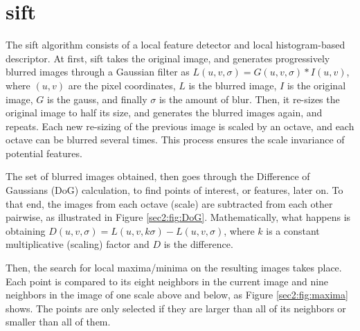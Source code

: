 \section{\acrlong{sift}}
\label{appendix:cha1:sift}
The \acrshort{sift} algorithm consists of a local feature detector and local histogram-based descriptor. At first, \acrshort{sift} takes the original image, and generates progressively blurred images through a Gaussian filter as $L (u , v , \sigma ) = G ( u , v, \sigma ) * I ( u , v )$, where $(u, v)$ are the pixel coordinates, $L$ is the blurred image, $I$ is the original image, $G$ is the \gls{gauss}, and finally $\sigma$ is the amount of blur. Then, it re-sizes the original image to half its size, and generates the blurred images again, and repeats. Each new re-sizing of the previous image is scaled by an octave, and each octave can be blurred  several times. This process ensures the scale invariance of potential features.

The set of blurred images obtained, then goes through the Difference of Gaussians (DoG) calculation, to find points of interest, or features, later on. To that end, the images from each octave (scale) are subtracted from each other pairwise, as illustrated in Figure \ref{sec2:fig:DoG}. Mathematically, what happens is obtaining $D ( u , v , \sigma ) = L ( u , v , k \sigma ) - L ( u , v , \sigma )$, where $k$ is a constant multiplicative (scaling) factor and $D$ is the difference.

Then, the search for local maxima/minima on the resulting images takes place. Each point is compared to its eight neighbors in the current image and nine neighbors in the image of one scale above and below, as Figure \ref{sec2:fig:maxima} shows. The points are only selected if they are larger than all of its neighbors or smaller than all of them.

